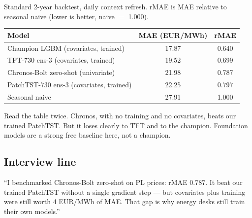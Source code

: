 Standard 2-year backtest, daily context refresh. rMAE is MAE
relative to seasonal naive (lower is better, naive $=$ 1.000).

\begin{tabular}{lcc}
\hline
Model & MAE (EUR/MWh) & rMAE \\
\hline
Champion LGBM (covariates, trained) & 17.87 & 0.640 \\
TFT-730 ens-3 (covariates, trained) & 19.52 & 0.699 \\
Chronos-Bolt zero-shot (univariate) & 21.98 & 0.787 \\
PatchTST-730 ens-3 (covariates, trained) & 22.25 & 0.797 \\
Seasonal naive & 27.91 & 1.000 \\
\hline
\end{tabular}

\vspace{0.5em}
Read the table twice. Chronos, with no training and no covariates,
beats our trained PatchTST. But it loses clearly to TFT and to the
champion. Foundation models are a strong free baseline here,
not a champion.

\subsection{Interview line}

``I benchmarked Chronos-Bolt zero-shot on PL prices: rMAE 0.787.
It beat our trained PatchTST without a single gradient step ---
but covariates plus training were still worth 4 EUR/MWh of MAE.
That gap is why energy desks still train their own models.''
